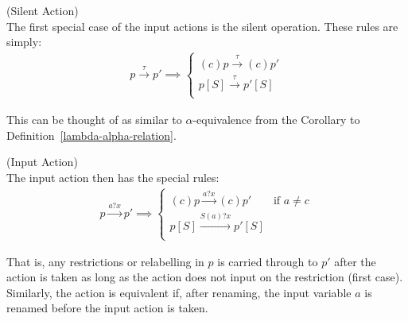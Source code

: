 \documentclass{article}
\begin{document}
        \begin{definition}{(Silent Action)\\}
            The first special case of the input actions is the silent operation.
            These rules are simply:
            \begin{align}
                p \xrightarrow{\tau} p' \implies
                \begin{cases}
                    (c)p \xrightarrow{\tau} (c)p' \\
                    p[S] \xrightarrow{\tau} p'[S] \\
                \end{cases}
            \end{align}
        \end{definition}
        This can be thought of as similar to $\alpha$-equivalence from the Corollary to Definition~\ref{lambda-alpha-relation}. \\


        \begin{definition}{(Input Action)\\}
            The input action then has the special rules:           
            \begin{align}
                p \xrightarrow{a?x} p' \implies
                \begin{cases}
                    (c)p \xrightarrow{a?x} (c)p' & \text{if } a \neq c \\
                    p[S] \xrightarrow{S(a)?x} p'[S] \label{eqn:ccs-rename-then-action}\\
                \end{cases}
            \end{align}
        \end{definition}
        That is, any restrictions or relabelling in $p$ is carried through to $p'$ after the action is taken as long as the action does not input on the restriction (first case).
        Similarly, the action is equivalent if, after renaming, the input variable $a$ is renamed before the input action is taken. \\
\end{document}
